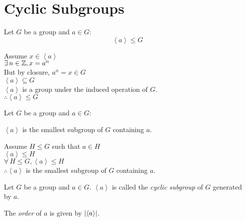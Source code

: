 \documentclass[letterpaper,12pt,fleqn]{article}
\newcommand{\cycle}[1]{\left<#1\right>}
\begin{document}
\section*{Cyclic Subgroups}

\begin{theorem}
  Let $G$ be a group and $a\in G$:
  \[\cycle{a}\le G\]
\end{theorem}

\begin{theproof}
  Assume $x\in\cycle{a}$ \\
  $\exists\,n\in\mathbb{Z},x=a^n$ \\
  But by closure, $a^n=x\in G$ \\
  $\cycle{a}\subseteq G$ \\
  $\cycle{a}$ is a group under the induced operation of $G$. \\
  $\therefore\cycle{a}\le G$
\end{theproof}

\begin{corollary}
  Let $G$ be a group and $a\in G$:
  
  $\cycle{a}$ is the smallest subgroup of $G$ containing $a$.
\end{corollary}

\begin{theproof}
  Assume $H\le G$ such that $a\in H$ \\
  $\cycle{a}\le H$ \\
  $\forall\,H\le G,\cycle{a}\le H$ \\
  $\therefore\cycle{a}$ is the smallest subgroup of $G$ containing $a$.
\end{theproof}

\begin{definition}
  Let $G$ be a group and $a\in G$. $\cycle{a}$ is called the
  \emph{cyclic subgroup} of $G$ generated by $a$.

  The \emph{order} of $a$ is given by $\abs{\cycle{a}}$.
\end{definition}
\end{document}
